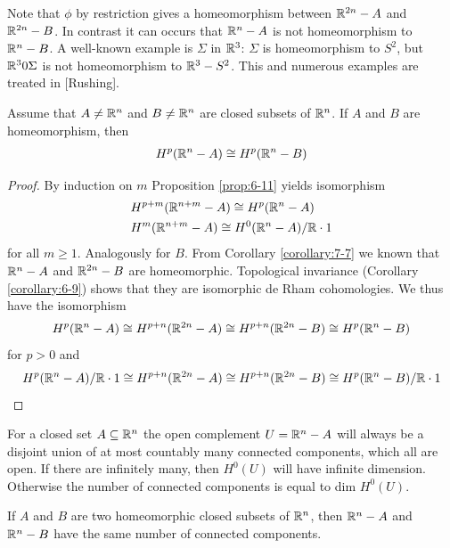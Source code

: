 Note that $\phi$ by restriction gives a homeomorphism between $\mathbb{R}^{2n}-A$ and $\mathbb{R}^{2n}-B$.
In contrast it can occurs that $\mathbb{R}^n-A$ is not homeomorphism to $\mathbb{R}^n-B$. A well-known example 
is  $\Sigma$ in $\mathbb{R}^3$: $\Sigma$ is homeomorphism to $S^2$, but 
$\mathbb{R}^30\Sigma$ is not homeomorphism to $\mathbb{R}^3-S^2$. This and numerous examples are treated in [Rushing].


\begin{theorem}\label{theorem:7-8}
  Assume that $A\neq\mathbb{R}^n$ and $B\neq\mathbb{R}^n$ are closed subsets of $\mathbb{R}^n$. If $A$ and $B$
  are homeomorphism, then 
  \begin{align*}
    H^p(\mathbb{R}^n-A)\cong H^p(\mathbb{R}^n-B)
  \end{align*}
\end{theorem}

\begin{proof}
  By induction on $m$ Proposition \ref{prop:6-11} yields isomorphism 
  \begin{align*}
    & H^{p+m}(\mathbb{R}^{n+m}-A)\cong H^p(\mathbb{R}^n-A) \\
    & H^{m}(\mathbb{R}^{n+m}-A)\cong H^0(\mathbb{R}^n-A)/\mathbb{R}\cdot 1 
  \end{align*}
  for all $m\ge 1$. Analogously for $B$. From Corollary \ref{corollary:7-7} we known that $\mathbb{R}^n-A$
  and $\mathbb{R}^{2n}-B$ are homeomorphic. Topological invariance (Corollary \ref{corollary:6-9}) shows that 
  they are isomorphic de Rham cohomologies. We thus have the isomorphism
  \begin{align*}
    H^p(\mathbb{R}^n-A) 
      \cong H^{p+n}(\mathbb{R}^{2n}-A) 
      \cong H^{p+n}(\mathbb{R}^{2n}-B)
      \cong H^p(\mathbb{R}^n-B)
  \end{align*}
  for $p>0$ and 
  \begin{align*}
    H^p(\mathbb{R}^n-A)/\mathbb{R}\cdot 1
      \cong H^{p+n}(\mathbb{R}^{2n}-A) 
      \cong H^{p+n}(\mathbb{R}^{2n}-B)
      \cong H^p(\mathbb{R}^n-B)/\mathbb{R}\cdot 1
  \end{align*}
\end{proof}

For a closed set $A\subseteq\mathbb{R}^n$ the open complement $U=\mathbb{R}^n-A$ will always be
a disjoint union of at most countably many connected components, which all
are open. If there are infinitely many, then $H^0(U)$ will have infinite dimension.
Otherwise the number of connected components is equal to dim $H^0(U)$.


\begin{corollary}\label{corollary:7-9}
  If $A$ and $B$ are two homeomorphic closed subsets of $\mathbb{R}^n$, then $\mathbb{R}^n-A$
and $\mathbb{R}^n- B$ have the same number of connected components.
\end{corollary}


